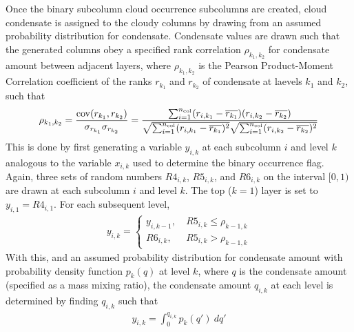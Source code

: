 Once the binary subcolumn cloud occurrence subcolumns are created, cloud condensate is assigned to the cloudy columns by drawing from an assumed probability distribution for condensate. Condensate values are drawn such that the generated columns obey a specified rank correlation $\rho_{k_1, k_2}$ for condensate amount between adjacent layers, where $\rho_{k_1, k_2}$ is the Pearson Product-Moment Correlation coefficient of the ranks $r_{k_1}$ and $r_{k_2}$ of condensate at laevels $k_1$ and $k_2$, such that
\begin{gather}
    \rho_{k_1, k_2} = \frac{
        {\rm cov}(r_{k_1}, r_{k_2})
    }{
        \sigma_{r_{k_1}} \sigma_{r_{k_2}}
    } = \frac{
        \sum_{i=1}^{n_{\rm col}} (r_{i, k_1} - \overline{r_{k_1}})(r_{i, k_2} - \overline{r_{k_2}})
    }{
        \sqrt{\sum_{i=1}^{n_{\rm col}} (r_{i, k_1} - \overline{r_{k_1}})^2}
        \sqrt{\sum_{i=1}^{n_{\rm col}} (r_{i, k_2} - \overline{r_{k_2}})^2}
    }
    \label{rankcorr_equation}
\end{gather}
This is done by first generating a variable $y_{i, k}$ at each subcolumn $i$ and level $k$ analogous to the variable $x_{i, k}$ used to determine the binary occurrence flag. Again, three sets of random numbers $R4_{i, k}$, $R5_{i, k}$, and $R6_{i, k}$ on the interval $[0, 1)$ are drawn at each subcolumn $i$ and level $k$. The top ($k = 1$) layer is set to $y_{i, 1} = R4_{i, 1}$. For each subsequent level,
\begin{align}
    y_{i, k} = \begin{cases}
        y_{i, k-1}, ~ & R5_{i, k} \le \rho_{k-1, k} \\
        R6_{i, k},  ~ & R5_{i, k} > \rho_{k-1, k}
    \end{cases}
\end{align}
With this, and an assumed probability distribution for condensate amount with probability density function $p_k(q)$ at level $k$, where $q$ is the condensate amount (specified as a mass mixing ratio), the condensate amount $q_{i, k}$ at each level is determined by finding $q_{i, k}$ such that
\begin{align}
    y_{i, k} = \int_0^{q_{i, k}} p_{k}(q') ~dq'
\end{align}

